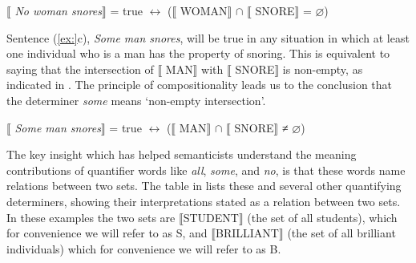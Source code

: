 \ea
{}$\llbracket$ \textit{No woman snores}$\rrbracket$  = true $\leftrightarrow $ ($\llbracket$ WOMAN$\rrbracket$  ${\cap}$ $\llbracket$ SNORE$\rrbracket$  = ⌀)
\z


Sentence (\ref{ex:}c), \textit{Some man snores}, will be true in any situation in which at least one individual who is a man has the property of snoring. This is equivalent to saying that the intersection of $\llbracket$ MAN$\rrbracket$  with $\llbracket$ SNORE$\rrbracket$  is non-empty, as indicated in . The principle of compositionality leads us to the conclusion that the determiner \textit{some} means ‘non-empty intersection’.


\ea
{}$\llbracket$ \textit{Some man snores}$\rrbracket$  = true $\leftrightarrow $ ($\llbracket$ MAN$\rrbracket$  ${\cap}$ $\llbracket$ SNORE$\rrbracket$  ≠ ⌀)
\z


The key insight which has helped semanticists understand the meaning contributions of quantifier words like \textit{all}, \textit{some}, and \textit{no}, is that these words name relations between two sets. The table in  lists these and several other quantifying determiners, showing their interpretations stated as a relation between two sets. In these examples the two sets are \textsc{$\llbracket$}STUDENT$\rrbracket$  (the set of all students), which for convenience we will refer to as S, and \textsc{$\llbracket$}BRILLIANT$\rrbracket$  (the set of all brilliant individuals) which for convenience we will refer to as B.


